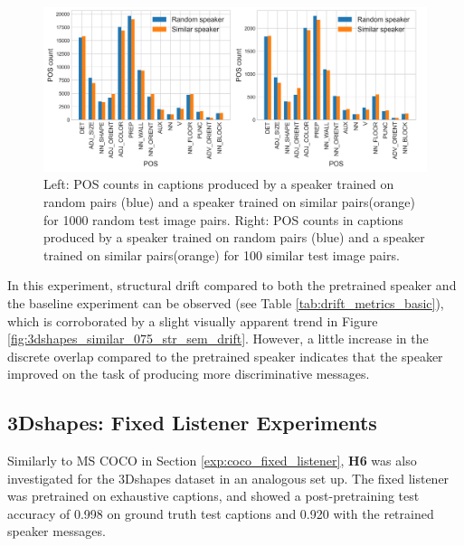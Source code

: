 \begin{figure}
	\centering
	\includegraphics[width=\linewidth]{images/3dshapes_random_vs_similar_POS_counts.png}
	\caption{Left: POS counts in captions produced by a speaker trained on random pairs (blue) and a speaker trained on similar pairs(orange) for 1000 random test image pairs. Right: POS counts in captions produced by a speaker trained on random pairs (blue) and a speaker trained on similar pairs(orange) for 100 similar test image pairs. }
	\label{fig:3dshapes_pos}
\end{figure}

In this experiment, structural drift compared to both the pretrained speaker and the baseline experiment can be observed (see Table \ref{tab:drift_metrics_basic}), which is corroborated by a slight visually apparent trend in Figure \ref{fig:3dshapes_similar_075_str_sem_drift}. However, a little increase in the discrete overlap compared to the pretrained speaker indicates that the speaker improved on the task of producing more discriminative messages.


\subsection{3Dshapes: Fixed Listener Experiments}

Similarly to MS COCO in Section \ref{exp:coco_fixed_listener}, \textbf{H6} was also investigated for the 3Dshapes dataset in an analogous set up. The fixed listener was pretrained on exhaustive captions, and showed a post-pretraining test accuracy of 0.998 on ground truth test captions and 0.920 with the retrained speaker messages. 

